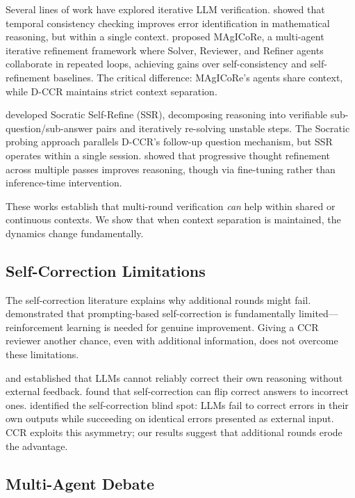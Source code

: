 \documentclass[11pt]{article}
\begin{document}
Several lines of work have explored iterative LLM verification.
\citet{guo2025temporal} showed that temporal consistency checking improves error identification in mathematical reasoning, but within a single context.
\citet{chen2025magicore} proposed MAgICoRe, a multi-agent iterative refinement framework where Solver, Reviewer, and Refiner agents collaborate in repeated loops, achieving gains over self-consistency and self-refinement baselines.
The critical difference: MAgICoRe's agents share context, while D-CCR maintains strict context separation.

\citet{shi2025ssr} developed Socratic Self-Refine (SSR), decomposing reasoning into verifiable sub-question/sub-answer pairs and iteratively re-solving unstable steps.
The Socratic probing approach parallels D-CCR's follow-up question mechanism, but SSR operates within a single session.
\citet{du2025thinkthrice} showed that progressive thought refinement across multiple passes improves reasoning, though via fine-tuning rather than inference-time intervention.

These works establish that multi-round verification \emph{can} help within shared or continuous contexts. We show that when context separation is maintained, the dynamics change fundamentally.

\subsection{Self-Correction Limitations}

The self-correction literature explains why additional rounds might fail.
\citet{kumar2024score} demonstrated that prompting-based self-correction is fundamentally limited---reinforcement learning is needed for genuine improvement.
Giving a CCR reviewer another chance, even with additional information, does not overcome these limitations.

\citet{huang2024llms} and \citet{kamoi2024when} established that LLMs cannot reliably correct their own reasoning without external feedback.
\citet{zhang2025dark} found that self-correction can flip correct answers to incorrect ones.
\citet{tsui2025selfcorrection} identified the self-correction blind spot: LLMs fail to correct errors in their own outputs while succeeding on identical errors presented as external input.
CCR exploits this asymmetry; our results suggest that additional rounds erode the advantage.

\subsection{Multi-Agent Debate}
\end{document}
